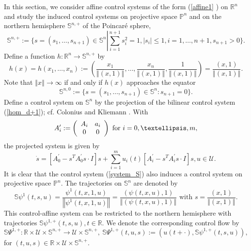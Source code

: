 \documentclass[preprint,12pt]{elsarticle}
\begin{document}
In this section, we consider affine control systems of the form (\ref{affine1}%
) on $\mathbb{R}^{n}$ and study the induced control systems on projective
space $\mathbb{P}^{n}$ and on the northern hemisphere $\mathbb{S}^{n,+}$ of
the Poincar\'{e} sphere,%
\[
\mathbb{S}^{n,+}:=\{s=(s_{1},\ldots,s_{n+1})\in\mathbb{S}^{n}\left\vert
{}\right.  \sum_{i=1}^{n+1}s_{i}^{2}=1,\left\vert s_{i}\right\vert
\leq1,i=1,\ldots,n+1,s_{n+1}>0\}.
\]
Define a function $h:\mathbb{R}^{n}\rightarrow\mathbb{S}^{n,+}$ by%
\begin{equation}
h(x)=h(x_{1},\ldots,x_{n}):=\left(  \frac{x_{1}}{\left\Vert (x,1)\right\Vert
},\ldots,\frac{x_{n}}{\left\Vert (x,1)\right\Vert },\frac{1}{\left\Vert
(x,1)\right\Vert }\right)  =\frac{(x,1)}{\left\Vert (x,1)\right\Vert }.
\label{h}%
\end{equation}
Note that $\left\Vert x\right\Vert \rightarrow\infty$ if and only if $h(x)$
approaches the equator%
\[
\mathbb{S}^{n,0}:=\{s=(s_{1},\ldots,s_{n+1})\in\mathbb{S}^{n}:s_{n+1}=0\}.
\]
Define a control system on $\mathbb{S}^{n}$ by the projection of the bilinear
control system (\ref{hom_d+1}); cf. Colonius and Kliemann \cite[Section
6.1]{ColK00}. With%
\[
A_{i}^{\prime}:=\left(
\begin{array}
[c]{cc}%
A_{i} & a_{i}\\
0 & 0
\end{array}
\right)  \text{ for }i=0,\ldots,m,
\]
the projected system is given by%
\begin{equation}
\dot{s}=\left[  A_{0}^{\prime}-s^{T}A_{0}^{\prime}s\cdot I\right]
s+\sum_{i=1}^{m}u_{i}(t)\left[  A_{i}^{\prime}-s^{T}A_{i}^{\prime}s\cdot
I\right]  s,u\in\mathcal{U}. \label{system_S}%
\end{equation}
It is clear that the control system (\ref{system_S}) also induces a control
system on projective space $\mathbb{P}^{n}$. The trajectories on
$\mathbb{S}^{n}$ are denoted by%
\[
\mathbb{S}\psi^{1}(t,s,u)=\frac{\psi^{1}(t,x,1,u)}{\left\Vert \psi
^{1}(t,x,1,u)\right\Vert }=\frac{\left(  \psi(t,x,u),1\right)  }{\left\Vert
\left(  \psi(t,x,u),1\right)  \right\Vert }\text{ with }s=\frac{(x,1)}%
{\left\Vert (x,1)\right\Vert }.
\]
This control-affine system can be restricted to the northern hemisphere with
trajectories $\mathbb{S}\psi^{1,+}(t,s,u),t\in\mathbb{R}$. We denote the
corresponding control flow by%
\[
\mathbb{S}\Psi^{1,+}:\mathbb{R}\times\mathcal{U}\times\mathbb{S}%
^{n,+}\rightarrow\mathcal{U}\times\mathbb{S}^{n,+},~\mathbb{S}\Psi
^{1,+}(t,u,s):=(u(t+\cdot),\mathbb{S}\psi^{1,+}(t,s,u)),
\]
for $(t,u,s)\in\mathbb{R}\times\mathcal{U}\times\mathbb{S}^{n,+}$.
\end{document}
